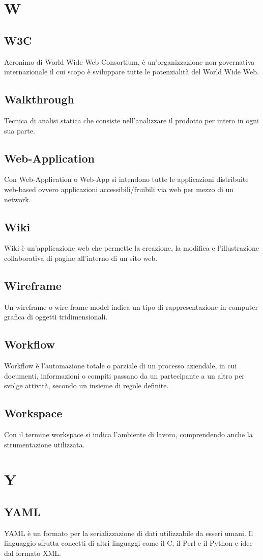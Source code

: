\newpage \section{W}
\subsection{W3C} Acronimo di World Wide Web Consortium, è un'organizzazione non governativa internazionale il cui scopo è sviluppare tutte le potenzialità del World Wide Web.
\subsection{Walkthrough} Tecnica di analisi statica che consiste nell'analizzare il prodotto per intero in ogni sua parte.
\subsection{Web-Application} Con Web-Application o Web-App si intendono tutte le applicazioni distribuite web-based ovvero applicazioni accessibili/fruibili via web per mezzo di un network. 
\subsection{Wiki}  Wiki è un'applicazione web che permette la creazione, la modifica e l'illustrazione collaborativa di pagine all'interno di un sito web.
\subsection{Wireframe} Un wireframe o wire frame model indica un tipo di rappresentazione in computer grafica di oggetti tridimensionali.
\subsection{Workflow} Workflow è l’automazione totale o parziale di un processo aziendale, in cui documenti, informazioni o compiti passano da un partecipante a un altro per svolge attività, secondo un insieme di regole definite.
\subsection{Workspace} Con il termine workspace si indica l'ambiente di lavoro, comprendendo anche la strumentazione utilizzata.

\newpage \section{Y}
\subsection{YAML}  YAML è un formato per la serializzazione di dati utilizzabile da esseri umani. Il linguaggio sfrutta concetti di altri linguaggi come il C, il Perl e il Python e idee dal formato XML.